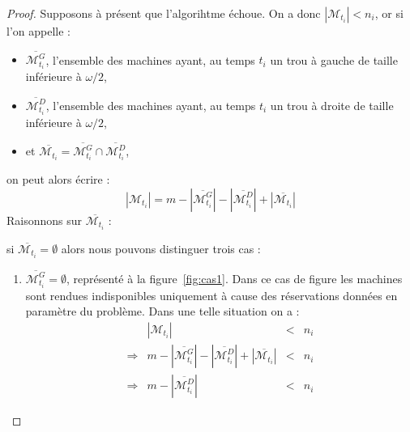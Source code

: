 \documentclass[a4paper,9pt]{article}
\begin{document}
\begin{proof}
    Supposons à présent que l'algorihtme échoue. On a donc $|\mathcal{M}_{t_i}| < n_i$, or si l'on
    appelle : 
    \begin{itemize}
        \item $\overline{\mathcal{M}_{t_i}^G}$, l'ensemble des machines ayant, au temps $t_i$ un
            trou à gauche de taille inférieure à $\omega / 2$,
        \item $\overline{\mathcal{M}_{t_i}^D}$, l'ensemble des machines ayant, au temps $t_i$ un
            trou à droite de taille inférieure à $\omega / 2$,
        \item et $\overline{\mathcal{M}_{t_i}} = \overline{\mathcal{M}_{t_i}^G} \cap
            \overline{\mathcal{M}_{t_i}^D}$,
    \end{itemize}
    on peut alors écrire : \begin{displaymath}
        |\mathcal{M}_{t_i}| = m - |\overline{\mathcal{M}_{t_i}^G}| -
        |\overline{\mathcal{M}_{t_i}^D}| +
        |\overline{\mathcal{M}_{t_i}}|
    \end{displaymath}
    Raisonnons sur $\overline{\mathcal{M}_{t_i}}$ :
    \begin{bitemize}
        \item si $\overline{\mathcal{M}_{t_i}} = \emptyset$ alors nous pouvons distinguer trois cas
            :
            \begin{enumerate}
                \item $\overline{\mathcal{M}_{t_i}^G} = \emptyset$, représenté à la
                    figure~\ref{fig:cas1}. Dans ce cas de figure les machines sont rendues
                    indisponibles uniquement à cause des réservations données en paramètre du
                    problème. Dans une telle situation on a :
                    \begin{displaymath}
                        \begin{array}{rrcl}
                            & |\mathcal{M}_{t_i}| & < & n_i \\
                            \Rightarrow &  m - |\overline{\mathcal{M}_{t_i}^G}| -
                            |\overline{\mathcal{M}_{t_i}^D}| +
                            |\overline{\mathcal{M}_{t_i}}| & < & n_i \\
                            \Rightarrow & m - |\overline{\mathcal{M}_{t_i}^D}| & < & n_i
                        \end{array}
                    \end{displaymath}

\end{enumerate}
\end{bitemize}
\end{proof}
\end{document}

